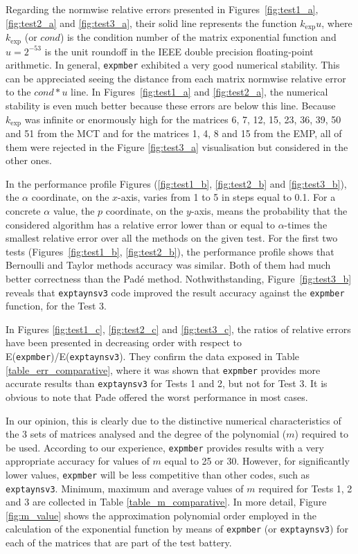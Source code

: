 \documentclass[preprint,10pt,numbers,sort&compress]{elsarticle}
\begin{document}
Regarding the normwise relative errors presented in Figures~\ref{fig:test1_a}, \ref{fig:test2_a} and \ref{fig:test3_a}, their solid line represents the function ${k_{\exp}}u$, where ${k_{\exp}}$ (or $cond$) is the condition number of the matrix exponential function \cite[Chapter 3]{High08} and $u=2^{-53}$ is the unit roundoff in the IEEE double precision floating-point arithmetic. In general, \texttt{expmber} exhibited a very good numerical stability. This can be appreciated seeing the distance from each matrix normwise relative error to the $cond*u$ line. In Figures~\ref{fig:test1_a} and \ref{fig:test2_a}, the numerical stability is even much better because these errors are below this line. Because ${k_{\exp}}$ was infinite or enormously high for the matrices 6, 7, 12, 15, 23, 36, 39, 50 and 51 from the MCT and for the matrices 1, 4, 8 and 15 from the EMP, all of them were rejected in the Figure \ref{fig:test3_a} visualisation but considered in the other ones.

In the performance profile Figures (\ref{fig:test1_b}, \ref{fig:test2_b} and \ref{fig:test3_b}), the $\alpha$ coordinate, on the $x$-axis, varies from 1 to 5 in steps equal to 0.1. For a concrete $\alpha$ value, the $p$ coordinate,  on the $y$-axis,  means the probability that the considered algorithm has a relative error lower than or equal to $\alpha$-times the smallest relative error over all the methods on the given test. For the first two tests (Figures~\ref{fig:test1_b}, \ref{fig:test2_b}), the performance profile shows that Bernoulli and Taylor methods accuracy was similar. Both of them had much better correctness than the Pad\'e method. Nothwithstanding, Figure~\ref{fig:test3_b} reveals that \texttt{exptaynsv3} code improved the result accuracy against the \texttt{expmber} function, for the Test 3. 

In Figures \ref{fig:test1_c}, \ref{fig:test2_c} and \ref{fig:test3_c}, the ratios of relative errors have been presented in decreasing order with respect to E(\texttt{expmber})/E(\texttt{exptaynsv3}). They confirm the data exposed in Table \ref{table_err_comparative}, where it was shown that \texttt{expmber} provides more accurate results than \texttt{exptaynsv3} for Tests 1 and 2, but not for Test 3. It is obvious to note that Pade offered the worst performance in most cases.

In our opinion, this is clearly due to the distinctive numerical characteristics of the 3 sets of matrices analysed and the degree of the polynomial ($m$) required to be used. According to our experience, \texttt{expmber} provides results with a very appropriate accuracy for values of $m$ equal to 25 or 30. However, for significantly lower values, \texttt{expmber} will be less competitive than other codes, such as \texttt{exptaynsv3}. Minimum, maximum and average values of $m$ required for Tests 1, 2 and 3 are collected in Table \ref{table_m_comparative}. In more detail, Figure \ref{fig:m_value} shows the approximation polynomial order employed in the calculation of the exponential function by means of \texttt{expmber} (or \texttt{exptaynsv3}) for each of the matrices that are part of the test battery.
\end{document}

